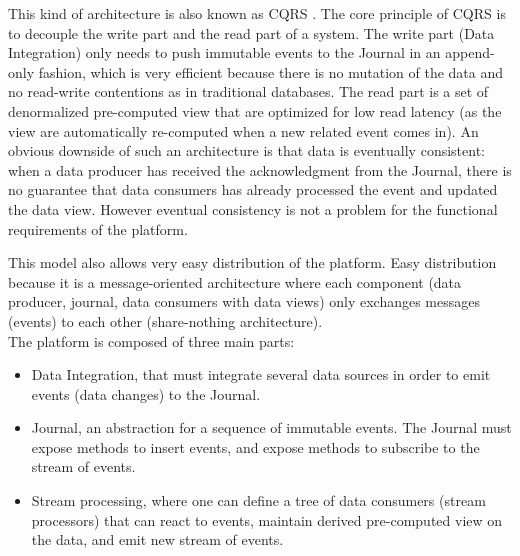 This kind of architecture is also known as CQRS . The core principle of CQRS is to decouple the write part and the read part
of a system. The write part (Data Integration) only needs to push immutable events to the Journal in an append-only fashion, which
is very efficient because there is no mutation of the data and no read-write contentions as in traditional databases.
The read part is a set of denormalized pre-computed view that are optimized for low read latency (as the view are automatically re-computed
when a new related event comes in).
An obvious downside of such an architecture is that data is eventually consistent: when a data producer has received the acknowledgment
from the Journal, there is no guarantee that data consumers has already processed the event and updated the data view. However eventual consistency is not
a problem for the functional requirements of the platform.

This model also allows very easy distribution of the platform. Easy distribution because it is a message-oriented
architecture where each component (data producer, journal, data consumers with data views) only exchanges messages (events) to each other (share-nothing architecture).
\\

The platform is composed of three main parts: 
\begin{itemize}
  \item Data Integration, that must integrate several data sources in order to emit 
events (data changes) to the Journal. 
  \item Journal, an abstraction for a sequence of immutable events. The Journal must expose methods to insert events,
  and expose methods to subscribe to the stream of events.
  \item Stream processing, where one can define a tree of data consumers (stream processors) that can react to
  events, maintain derived pre-computed view on the data, and emit new stream of events.
\end{itemize}

